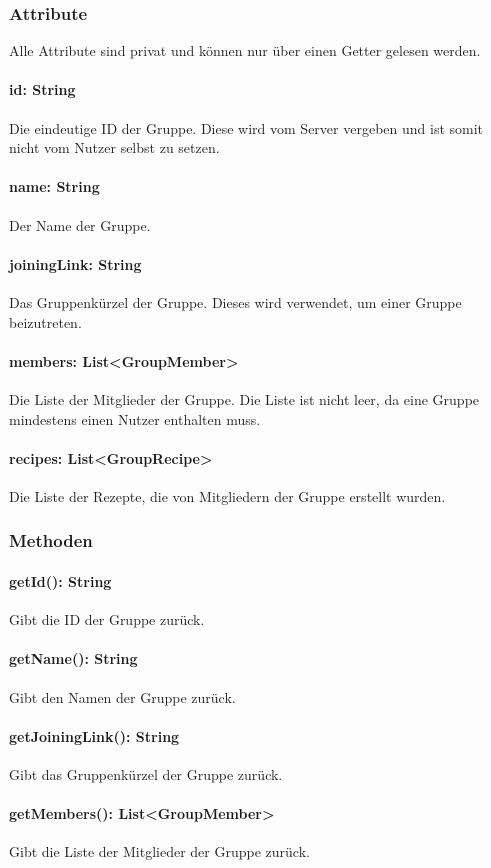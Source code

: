 \documentclass[parskip=full]{scrartcl}
\begin{document}
\subsubsection*{Attribute}
Alle Attribute sind privat und können nur über einen Getter gelesen werden.
\paragraph{id: String}
Die eindeutige ID der Gruppe. Diese wird vom Server vergeben und ist somit nicht vom Nutzer selbst zu setzen.
\paragraph{name: String}
Der Name der Gruppe.
\paragraph{joiningLink: String}
Das Gruppenkürzel der Gruppe. Dieses wird verwendet, um einer Gruppe beizutreten.
\paragraph{members: List<GroupMember>}
Die Liste der Mitglieder der Gruppe. Die Liste ist nicht leer, da eine Gruppe mindestens einen Nutzer enthalten muss.
\paragraph{recipes: List<GroupRecipe>}
Die Liste der Rezepte, die von Mitgliedern der Gruppe erstellt wurden.

\subsubsection*{Methoden}
\paragraph{getId(): String}
Gibt die ID der Gruppe zurück.
\paragraph{getName(): String}
Gibt den Namen der Gruppe zurück.
\paragraph{getJoiningLink(): String}
Gibt das Gruppenkürzel der Gruppe zurück.
\paragraph{getMembers(): List<GroupMember>}
Gibt die Liste der Mitglieder der Gruppe zurück.
\end{document}
